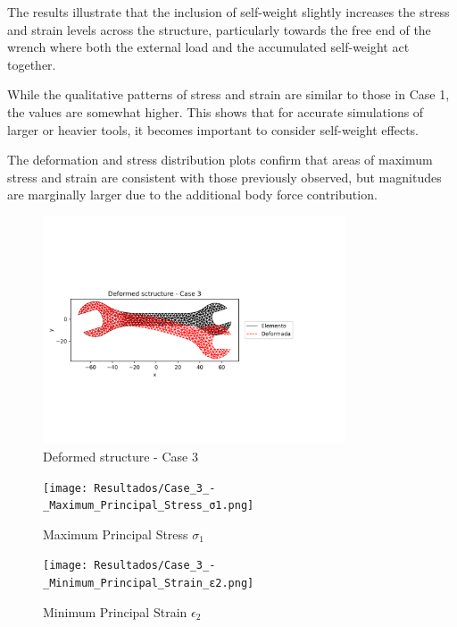 \documentclass[12pt]{article}
\begin{document}
The results illustrate that the inclusion of self-weight slightly increases the stress and strain levels across the structure, particularly towards the free end of the wrench where both the external load and the accumulated self-weight act together.

While the qualitative patterns of stress and strain are similar to those in Case 1, the values are somewhat higher.  
This shows that for accurate simulations of larger or heavier tools, it becomes important to consider self-weight effects.

The deformation and stress distribution plots confirm that areas of maximum stress and strain are consistent with those previously observed, but magnitudes are marginally larger due to the additional body force contribution.

\begin{figure}[H]
    \centering
    \includegraphics[width=0.8\textwidth]{Resultados/Deformed_sctructure_-_Case_3.png}
    \caption{Deformed structure - Case 3}
    \label{fig:fig23}
\end{figure}

\begin{figure}[H]
    \centering
    \begin{minipage}{0.48\textwidth}
        \centering
        \texttt{[image: Resultados/Case\_3\_-\_Maximum\_Principal\_Stress\_σ1.png]}
        \caption{Maximum Principal Stress $\sigma_1$}
        \label{fig:fig24}
    \end{minipage}
    \hfill
    \begin{minipage}{0.48\textwidth}
        \centering
        \texttt{[image: Resultados/Case\_3\_-\_Minimum\_Principal\_Strain\_ε2.png]}
        \caption{Minimum Principal Strain $\epsilon_2$}
        \label{fig:fig25}
    \end{minipage}
\end{figure}
\end{document}
